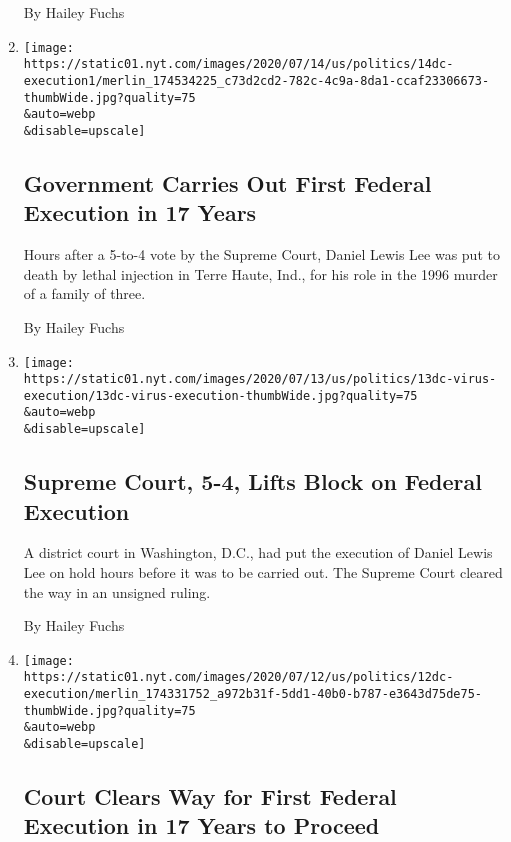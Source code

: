 \begin{enumerate}
  By Hailey Fuchs
\item
  \href{/2020/07/14/us/politics/daniel-lewis-lee-execution-crime.html}{}

  \texttt{[image: https://static01.nyt.com/images/2020/07/14/us/politics/14dc-execution1/merlin\_174534225\_c73d2cd2-782c-4c9a-8da1-ccaf23306673-thumbWide.jpg?quality=75\\\&auto=webp\\\&disable=upscale]}

  \hypertarget{government-carries-out-first-federal-execution-in-17-years}{%
  \subsection{Government Carries Out First Federal Execution in 17
  Years}\label{government-carries-out-first-federal-execution-in-17-years}}

  Hours after a 5-to-4 vote by the Supreme Court, Daniel Lewis Lee was
  put to death by lethal injection in Terre Haute, Ind., for his role in
  the 1996 murder of a family of three.

  By Hailey Fuchs
\item
  \href{/2020/07/13/us/politics/federal-execution.html}{}

  \texttt{[image: https://static01.nyt.com/images/2020/07/13/us/politics/13dc-virus-execution/13dc-virus-execution-thumbWide.jpg?quality=75\\\&auto=webp\\\&disable=upscale]}

  \hypertarget{supreme-court-5-4-lifts-block-on-federal-execution}{%
  \subsection{Supreme Court, 5-4, Lifts Block on Federal
  Execution}\label{supreme-court-5-4-lifts-block-on-federal-execution}}

  A district court in Washington, D.C., had put the execution of Daniel
  Lewis Lee on hold hours before it was to be carried out. The Supreme
  Court cleared the way in an unsigned ruling.

  By Hailey Fuchs
\item
  \href{/2020/07/12/us/politics/execution-daniel-lewis-lee.html}{}

  \texttt{[image: https://static01.nyt.com/images/2020/07/12/us/politics/12dc-execution/merlin\_174331752\_a972b31f-5dd1-40b0-b787-e3643d75de75-thumbWide.jpg?quality=75\\\&auto=webp\\\&disable=upscale]}

  \hypertarget{court-clears-way-for-first-federal-execution-in-17-years-to-proceed}{%
  \subsection{Court Clears Way for First Federal Execution in 17 Years
  to
  Proceed}\label{court-clears-way-for-first-federal-execution-in-17-years-to-proceed}}


\end{enumerate}
